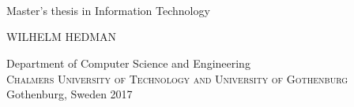 
\begin{titlepage}
			
\addtolength{\voffset}{2cm}

\begin{figure}[H]
\centering
\vspace{2cm}	%
\end{figure}

\mbox{}
\vfill
\renewcommand{\familydefault}{\sfdefault} \normalfont %
\textbf{{\Huge 	\toptitle 	\\[0.2cm] 
				\bottomtitle}} 	\\[0.5cm]
{\Large \subt}\\[0.5cm]
Master's thesis in Information Technology\setlength{\parskip}{1cm}

{\Large WILHELM HEDMAN} \setlength{\parskip}{2.9cm}

Department of Computer Science and Engineering \\
\textsc{Chalmers University of Technology and University of Gothenburg} \\
Gothenburg, Sweden 2017

\renewcommand{\familydefault}{\rmdefault} \normalfont %
\end{titlepage}


\newpage
\restoregeometry
\thispagestyle{empty}
\mbox{}


